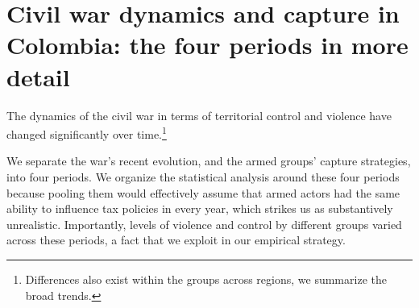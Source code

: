 \begin{table}[htbp]
\def\sym#1{\ifmmode^{#1}\else\(^{#1}\)\fi}
\caption{Consequences: Cumulative violence and economic activity}
\label{appendix3:consequences_economic}
\begin{center}
\end{center}
\end{table}

\clearpage


\section{Civil war dynamics and capture in Colombia: the four periods in more detail} \label{fourperiods}

The dynamics of the civil war in terms of territorial control and violence have changed significantly over time.\footnote{Differences also exist within the groups across regions, we summarize the broad trends.}

We separate the war's recent evolution, and the armed groups' capture strategies, into four periods. We organize the statistical analysis around these four periods because pooling them would effectively assume that armed actors had the same ability to influence tax policies in every year, which strikes us as substantively unrealistic. Importantly, levels of violence and control by different groups varied across these periods, a fact that we exploit in our empirical strategy.

